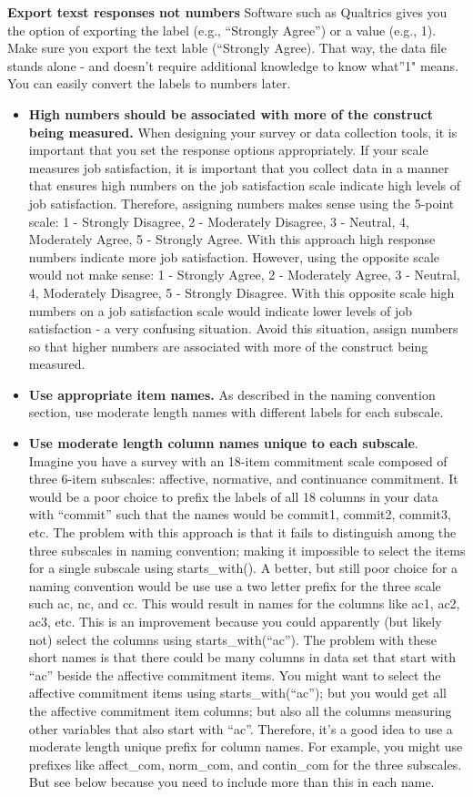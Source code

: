 \documentclass[
]{krantz}
\begin{document}
\textbf{Export texst responses not numbers} Software such as Qualtrics gives you the option of exporting the label (e.g., ``Strongly Agree'') or a value (e.g., 1). Make sure you export the text lable (``Strongly Agree). That way, the data file stands alone - and doesn't require additional knowledge to know what''1" means. You can easily convert the labels to numbers later.

\begin{itemize}
\item
  \textbf{High numbers should be associated with more of the construct being measured.} When designing your survey or data collection tools, it is important that you set the response options appropriately. If your scale measures job satisfaction, it is important that you collect data in a manner that ensures high numbers on the job satisfaction scale indicate high levels of job satisfaction. Therefore, assigning numbers makes sense using the 5-point scale: 1 - Strongly Disagree, 2 - Moderately Disagree, 3 - Neutral, 4, Moderately Agree, 5 - Strongly Agree. With this approach high response numbers indicate more job satisfaction. However, using the opposite scale would not make sense: 1 - Strongly Agree, 2 - Moderately Agree, 3 - Neutral, 4, Moderately Disagree, 5 - Strongly Disagree. With this opposite scale high numbers on a job satisfaction scale would indicate lower levels of job satisfaction - a very confusing situation. Avoid this situation, assign numbers so that higher numbers are associated with more of the construct being measured.
\item
  \textbf{Use appropriate item names.} As described in the naming convention section, use moderate length names with different labels for each subscale.
\item
  \textbf{Use moderate length column names unique to each subscale}. Imagine you have a survey with an 18-item commitment scale \citep{meyer1993commitment} composed of three 6-item subscales: affective, normative, and continuance commitment. It would be a poor choice to prefix the labels of all 18 columns in your data with ``commit'' such that the names would be commit1, commit2, commit3, etc. The problem with this approach is that it fails to distinguish among the three subscales in naming convention; making it impossible to select the items for a single subscale using starts\_with(). A better, but still poor choice for a naming convention would be use use a two letter prefix for the three scale such ac, nc, and cc. This would result in names for the columns like ac1, ac2, ac3, etc. This is an improvement because you could apparently (but likely not) select the columns using starts\_with(``ac''). The problem with these short names is that there could be many columns in data set that start with ``ac'' beside the affective commitment items. You might want to select the affective commitment items using starts\_with(``ac''); but you would get all the affective commitment item columns; but also all the columns measuring other variables that also start with ``ac''. Therefore, it's a good idea to use a moderate length unique prefix for column names. For example, you might use prefixes like affect\_com, norm\_com, and contin\_com for the three subscales. But see below because you need to include more than this in each name.

\end{itemize}
\end{document}
